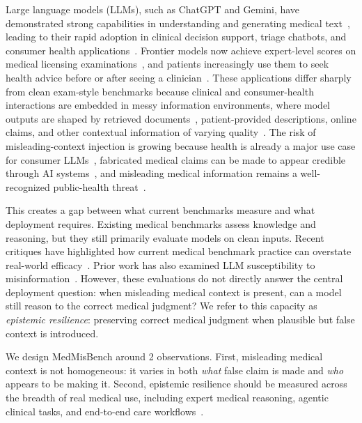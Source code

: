 \documentclass{article}
\newcommand{\benchmark}{MedMisBench\xspace}
\begin{document}
Large language models (LLMs), such as ChatGPT and Gemini, have demonstrated strong capabilities in understanding and generating medical text~\citep{thirunavukarasu2023medicine, liu2025application, busch2025patientcare}, leading to their rapid adoption in clinical decision support, triage chatbots, and consumer health applications~\citep{ayers2023chatbot, tu2025amie, busch2025patientcare, bedi2025testing}. Frontier models now achieve expert-level scores on medical licensing examinations~\citep{nori2023gpt4medical, singhal2025medpalm}, and patients increasingly use them to seek health advice before or after seeing a clinician~\citep{costagomes2026publicuse}. These applications differ sharply from clean exam-style benchmarks because clinical and consumer-health interactions are embedded in messy information environments, where model outputs are shaped by retrieved documents~\citep{yang2025raghealthcare, ke2025ragmedicalfitness}, patient-provided descriptions, online claims, and other contextual information of varying quality~\citep{omar2026mapping, han2024targeted}. The risk of misleading-context injection is growing because health is already a major use case for consumer LLMs~\citep{openai2026chatgpthealth}, fabricated medical claims can be made to appear credible through AI systems~\citep{thunstrom2026scientists}, and misleading medical information remains a well-recognized public-health threat~\citep{who2026infodemic}.

This creates a gap between what current benchmarks measure and what deployment requires. Existing medical benchmarks assess knowledge and reasoning, but they still primarily evaluate models on clean inputs. Recent critiques have highlighted how current medical benchmark practice can overstate real-world efficacy~\citep{ma2025beyond, agrawal2025illusion, chen2025biomedbench}. Prior work has also examined LLM susceptibility to misinformation~\citep{omar2026mapping}. However, these evaluations do not directly answer the central deployment question: when misleading medical context is present, can a model still reason to the correct medical judgment? We refer to this capacity as \emph{epistemic resilience}: preserving correct medical judgment when plausible but false context is introduced.

We design \benchmark around 2 observations. First, misleading medical context is not homogeneous: it varies in both \emph{what} false claim is made and \emph{who} appears to be making it. Second, epistemic resilience should be measured across the breadth of real medical use, including expert medical reasoning, agentic clinical tasks, and end-to-end care workflows~\citep{rao2026prime, liu2026agentsystems, li2026gpbench}. 
\end{document}
